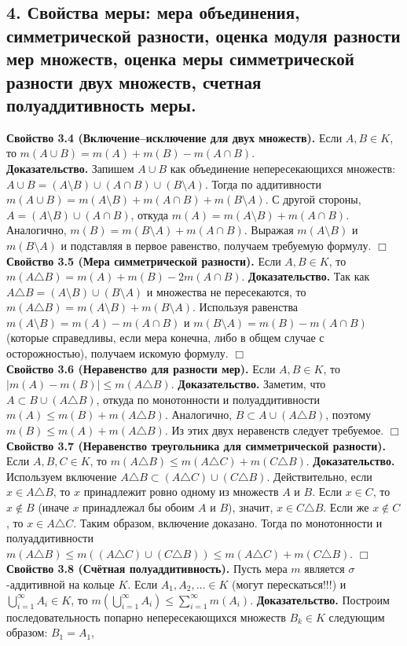 \documentclass[12pt]{article}
\begin{document}
\subsection*{4. Свойства меры: мера объединения, симметрической разности, оценка модуля
разности мер множеств, оценка меры симметрической разности двух множеств,
счетная полуаддитивность меры.}
\textbf{Свойство 3.4 (Включение–исключение для двух множеств).} Если $A, B \in K$, то $m(A \cup B) = m(A) + m(B) - m(A \cap B)$. \\\textbf{Доказательство.} Запишем $A \cup B$ как объединение непересекающихся множеств: $A \cup B = (A \setminus B) \cup (A \cap B) \cup (B \setminus A)$. Тогда по аддитивности $m(A \cup B) = m(A \setminus B) + m(A \cap B) + m(B \setminus A)$. С другой стороны, $A = (A \setminus B) \cup (A \cap B)$, откуда $m(A) = m(A \setminus B) + m(A \cap B)$. Аналогично, $m(B) = m(B \setminus A) + m(A \cap B)$. Выражая $m(A \setminus B)$ и $m(B \setminus A)$ и подставляя в первое равенство, получаем требуемую формулу. \hfill $\Box$ \\\textbf{Свойство 3.5 (Мера симметрической разности).} Если $A, B \in K$, то $m(A \triangle B) = m(A) + m(B) - 2m(A \cap B)$. \textbf{Доказательство.} Так как $A \triangle B = (A \setminus B) \cup (B \setminus A)$ и множества не пересекаются, то $m(A \triangle B) = m(A \setminus B) + m(B \setminus A)$. Используя равенства $m(A \setminus B) = m(A) - m(A \cap B)$ и $m(B \setminus A) = m(B) - m(A \cap B)$ (которые справедливы, если мера конечна, либо в общем случае с осторожностью), получаем искомую формулу. \hfill $\Box$ \\\textbf{Свойство 3.6 (Неравенство для разности мер).} Если $A, B \in K$, то $|m(A) - m(B)| \le m(A \triangle B)$. \textbf{Доказательство.} Заметим, что $A \subset B \cup (A \triangle B)$, откуда по монотонности и полуаддитивности $m(A) \le m(B) + m(A \triangle B)$. Аналогично, $B \subset A \cup (A \triangle B)$, поэтому $m(B) \le m(A) + m(A \triangle B)$. Из этих двух неравенств следует требуемое. \hfill $\Box$ \\\textbf{Свойство 3.7 (Неравенство треугольника для симметрической разности).} Если $A, B, C \in K$, то $m(A \triangle B) \le m(A \triangle C) + m(C \triangle B)$. \textbf{Доказательство.} Используем включение $A \triangle B \subset (A \triangle C) \cup (C \triangle B)$. Действительно, если $x \in A \triangle B$, то $x$ принадлежит ровно одному из множеств $A$ и $B$. Если $x \in C$, то $x \notin B$ (иначе $x$ принадлежал бы обоим $A$ и $B$), значит, $x \in C \triangle B$. Если же $x \notin C$, то $x \in A \triangle C$. Таким образом, включение доказано. Тогда по монотонности и полуаддитивности $m(A \triangle B) \le m((A \triangle C) \cup (C \triangle B)) \le m(A \triangle C) + m(C \triangle B)$. \hfill $\Box$ \\\textbf{Свойство 3.8 (Счётная полуаддитивность).} Пусть мера $m$ является $\sigma$-аддитивной на кольце $K$. Если $A_1, A_2, \ldots \in K$ (могут перескаться!!!) и $\bigcup_{i=1}^{\infty} A_i \in K$, то $m\!\left(\bigcup_{i=1}^{\infty} A_i\right) \le \sum_{i=1}^{\infty} m(A_i)$. \textbf{Доказательство.} Построим последовательность попарно непересекающихся множеств $B_k \in K$ следующим образом: $B_1 = A_1$, 
\end{document}
